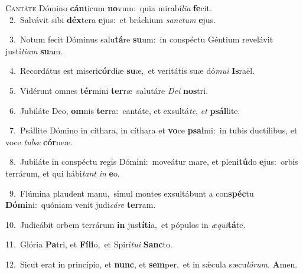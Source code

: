 \lettrine{\initial\textcolor{\initialcolor}{C}}{antáte} Dómino \textbf{cán}\-ticum \textbf{no}\-vum:~\star quia mirabí\-\textit{li}\-\textit{a} \textbf{fe}\-cit.\\
{\numbfont\textcolor{\numbcolor}{~2.}}~Salvávit sibi \textbf{déx}\-tera \textbf{e}\-jus:~\star et bráchium \textit{sanc}\-\textit{tum} \textbf{e}\-jus.\par
{\numbfont\textcolor{\numbcolor}{~3.}}~Notum fecit Dóminus salu\-\textbf{tá}\-re \textbf{su}\-um:~\star in conspéctu Géntium revelávit justí\-\textit{ti}\-\textit{am} \textbf{su}\-am.\par
{\numbfont\textcolor{\numbcolor}{~4.}}~Recordátus est miseri\-\textbf{cór}\-diæ \textbf{su}\-æ,~\star et veritátis suæ dó\-\textit{mu}\-\textit{i} \textbf{Is}\-raël.\par
{\numbfont\textcolor{\numbcolor}{~5.}}~Vidérunt omnes \textbf{tér}\-mini \textbf{ter}\-ræ~\star salutáre \textit{De}\-\textit{i} \textbf{nos}\-tri.\par
{\numbfont\textcolor{\numbcolor}{~6.}}~Jubiláte Deo, \textbf{om}\-nis \textbf{ter}\-ra:~\star cantáte, et exsultá\-\textit{te}\-, \textit{et} \textbf{psál}\-lite.\par
{\numbfont\textcolor{\numbcolor}{~7.}}~Psállite Dómino in cíthara, in cíthara et \textbf{vo}\-ce \textbf{psal}\-mi:~\star in tubis ductílibus, et voce \textit{tu}\-\textit{bæ} \textbf{cór}\-neæ.\par
{\numbfont\textcolor{\numbcolor}{~8.}}~Jubiláte in conspéctu regis Dómini:~\dagger moveátur mare, et pleni\-\textbf{tú}\-do \textbf{e}\-jus:~\star orbis terrárum, et qui hábi\textit{tant} \textit{in} \textbf{e}\-o.\par
{\numbfont\textcolor{\numbcolor}{~9.}}~Flúmina plaudent manu,~\dagger simul montes exsultábunt a con\-\textbf{spéc}\-tu \textbf{Dó}\-\textbf{mi}ni:~\star quóniam venit judi\-\textit{cá}\-\textit{re} \textbf{ter}\-ram.\par
{\numbfont\textcolor{\numbcolor}{10.}}~Judicábit orbem terrárum \textbf{in} jus\-\textbf{tí}\-\textbf{ti}a,~\star et pópulos in \textit{æ}\-\textit{qui}\textbf{tá}te.\par
{\numbfont\textcolor{\numbcolor}{11.}}~Glória \textbf{Pa}\-tri, et \textbf{Fí}\-\textbf{li}o,~\star et Spirí\-\textit{tu}\-\textit{i} \textbf{Sanc}\-to.\par
{\numbfont\textcolor{\numbcolor}{12.}}~Sicut erat in princípio, et \textbf{nunc}\-, et \textbf{sem}\-per,~\star et in sǽcula sæcu\-\textit{ló}\-\textit{rum}. \textbf{A}\-men.\par
